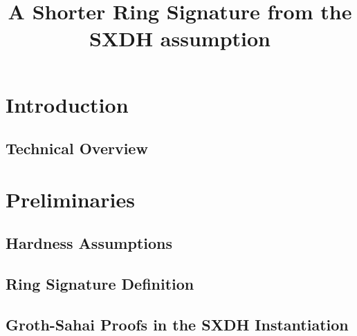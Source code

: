 \documentclass{llncs}
\title{A Shorter Ring Signature from the SXDH assumption}
\begin{document}
\maketitle

\begin{abstract}
    
\end{abstract} 

\section{Introduction}

     

   \subsection{Technical Overview} \label{sec:tech-overview}

	


    	



\section{Preliminaries}

	

	\subsection{Hardness Assumptions}

	

		\subsection{Ring Signature Definition}
    
            		

	\subsection{Groth-Sahai Proofs in the SXDH Instantiation} \label{sec:gs-proofs}

		
\end{document}
